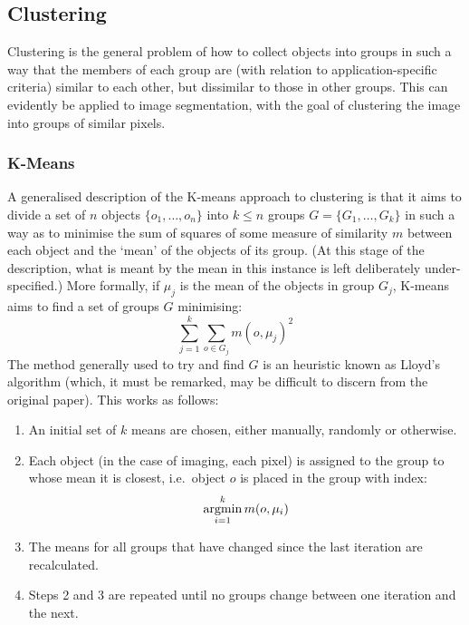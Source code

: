 
\subsection{Clustering}

Clustering is the general problem of how to collect objects into groups in such a way that the members of each group are (with relation to application-specific criteria) similar to each other, but dissimilar to those in other groups. This can evidently be applied to image segmentation, with the goal of clustering the image into groups of similar pixels.

\subsubsection{K-Means}


A generalised description of the K-means approach to clustering is that it aims to divide a set of $n$ objects $\{o_1,\ldots,o_n\}$ into $k \le n$ groups $G = \{G_1,\ldots,G_k\}$ in such a way as to minimise the sum of squares of some measure of similarity $m$ between each object and the `mean' of the objects of its group. (At this stage of the description, what is meant by the mean in this instance is left deliberately under-specified.) More formally, if $\mu_j$ is the mean of the objects in group $G_j$, K-means aims to find a set of groups $G$ minimising:
%
\[
\sum_{j=1}^k \sum_{o \in G_j} m(o, \mu_j)^2
\]
%
The method generally used to try and find $G$ is an heuristic known as Lloyd's algorithm \cite{lloyd82} (which, it must be remarked, may be difficult to discern from the original paper). This works as follows:

\begin{enumerate}

\item An initial set of $k$ means are chosen, either manually, randomly or otherwise.

\item Each object (in the case of imaging, each pixel) is assigned to the group to whose mean it is closest, i.e.~object $o$ is placed in the group with index:
%
\[
\mathop{\rm argmin}_{i=1}^k m(o, \mu_i)
\]

\item The means for all groups that have changed since the last iteration are recalculated.

\item Steps 2 and 3 are repeated until no groups change between one iteration and the next.

\end{enumerate}

